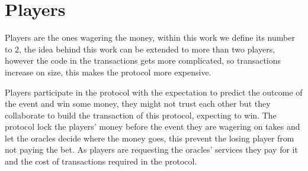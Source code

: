 \section{Players}

Players are the ones wagering the money, within this work we define its number
  to 2, the idea behind this work can be extended to more than two players,
  however the code in the transactions gets more complicated, so transactions
  increase on size, this makes the protocol more expensive.

Players participate in the protocol with the expectation to predict the
  outcome of the event and win some money, they might not trust each other but
  they collaborate to build the transaction of this protocol, expecting to win.
The protocol lock the players' money before the event they are wagering on takes
  and let the oracles decide where the money goes, this prevent the losing
  player from not paying the bet.
As players are requesting the oracles' services they pay for it and the cost
  of transactions required in the protocol.
